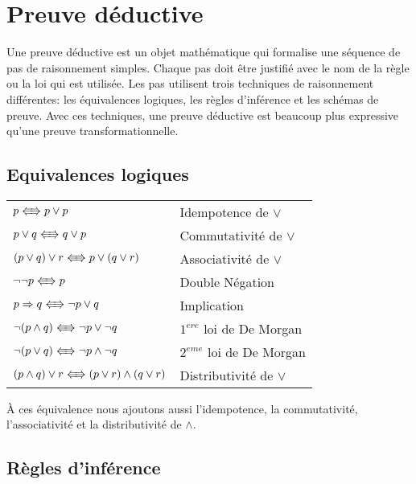 \section{Preuve déductive}

Une preuve déductive est un objet mathématique qui formalise une séquence
de pas de raisonnement simples.
Chaque pas doit être justifié avec le nom de la règle ou la loi qui est utilisée.
Les pas utilisent trois techniques de raisonnement différentes:
les équivalences logiques, les règles d'inférence et les schémas de preuve.
Avec ces techniques,
une preuve déductive est beaucoup plus expressive qu'une preuve transformationnelle.

\subsection{Equivalences logiques}
			\begin{center}
			\begin{tabular}{ll}
			$p \LRarrow p \lor p$ & Idempotence de $\lor$\\
			$p \lor q \LRarrow q \lor p$ & Commutativité de $\lor$\\
			$(p \lor q) \lor r \LRarrow p \lor (q \lor r)$ & Associativité de $\lor$\\
			$ \lnot \lnot p \LRarrow p$ & Double Négation\\
			$p \Rightarrow q \LRarrow \lnot p \lor q$ & Implication\\
			$\lnot (p \land q) \LRarrow \lnot p \lor \lnot q$ & $1^{ere}$ loi de De Morgan\\
			$\lnot (p \lor q) \LRarrow \lnot p \land \lnot q$ & $2^{eme}$ loi de De Morgan\\
			$(p \land q) \lor r \LRarrow (p \lor r) \land (q \lor r)$ & Distributivité de $\lor$\\
			\end{tabular}
			\end{center}
À ces équivalence nous ajoutons aussi l'idempotence, la commutativité, l'associativité et
la distributivité de $\land$.\\
			
\subsection{Règles d'inférence}
		
